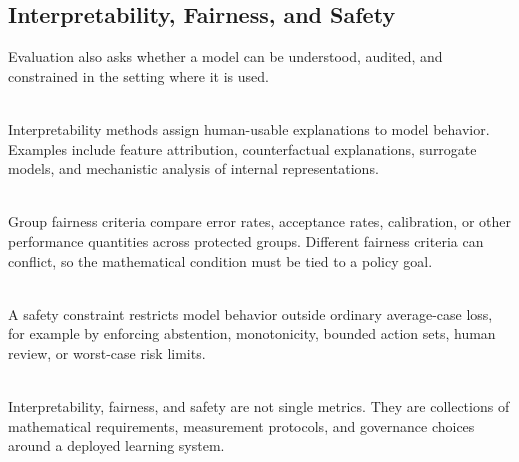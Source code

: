 \subsection{Interpretability, Fairness, and Safety}

Evaluation also asks whether a model can be understood, audited, and constrained in the setting where it is used.

\begin{definition} \label{def:sl-interpretability} \\
Interpretability methods assign human-usable explanations to model behavior.  Examples include feature attribution, counterfactual explanations, surrogate models, and mechanistic analysis of internal representations.
\end{definition}

\begin{definition} \label{def:sl-fairness-criteria} \\
Group fairness criteria compare error rates, acceptance rates, calibration, or other performance quantities across protected groups.  Different fairness criteria can conflict, so the mathematical condition must be tied to a policy goal.
\end{definition}

\begin{definition} \label{def:sl-safety-constraint} \\
A safety constraint restricts model behavior outside ordinary average-case loss, for example by enforcing abstention, monotonicity, bounded action sets, human review, or worst-case risk limits.
\end{definition}

\begin{remark} \label{rem:sl-evaluation-beyond-accuracy} \\
Interpretability, fairness, and safety are not single metrics.  They are collections of mathematical requirements, measurement protocols, and governance choices around a deployed learning system.
\end{remark}
